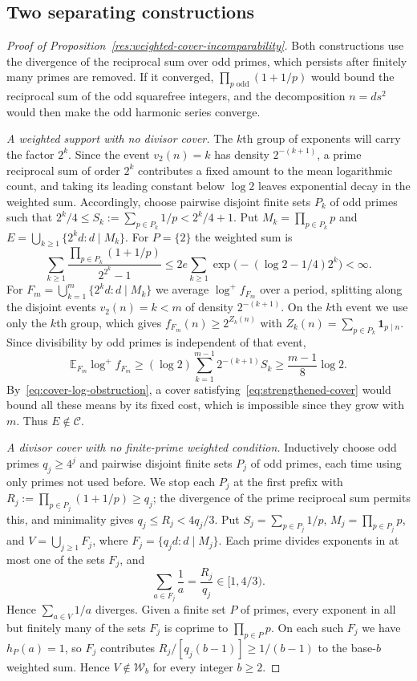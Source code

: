\documentclass[11pt]{article}
\begin{document}
\subsection{Two separating constructions}
\begin{proof}[Proof of Proposition~\ref{res:weighted-cover-incomparability}]
Both constructions use the divergence of the reciprocal sum over odd
primes, which persists after finitely many primes are removed. If it
converged, $\prod_{p\text{ odd}}(1+1/p)$ would bound the reciprocal sum
of the odd squarefree integers, and the decomposition $n=ds^2$ would
then make the odd harmonic series converge.

\emph{A weighted support with no divisor cover.}
The $k$th group of exponents will carry the factor $2^k$. Since the
event $v_2(n)=k$ has density $2^{-(k+1)}$, a prime reciprocal sum of
order $2^k$ contributes a fixed amount to the mean logarithmic count,
and taking its leading constant below $\log2$ leaves exponential decay
in the weighted sum. Accordingly, choose pairwise disjoint finite sets
$P_k$ of odd primes such that
$2^k/4\le S_k:=\sum_{p\in P_k}1/p<2^k/4+1$.  Put
$M_k=\prod_{p\in P_k}p$ and
$E=\bigcup_{k\ge1}\{2^kd:d\mid M_k\}$.
For $P=\{2\}$ the weighted sum is
\[
 \sum_{k\ge1}\frac{\prod_{p\in P_k}(1+1/p)}{2^{2^k}-1}
 \le 2e\sum_{k\ge1}
       \exp\bigl(-(\log2-1/4)2^k\bigr)<\infty.
\]
For $F_m=\bigcup_{k=1}^m\{2^kd:d\mid M_k\}$ we average
$\log^+f_{F_m}$ over a period, splitting along the disjoint events
$v_2(n)=k<m$ of density $2^{-(k+1)}$. On the $k$th event we use only
the $k$th group, which gives $f_{F_m}(n)\ge2^{Z_k(n)}$ with
$Z_k(n)=\sum_{p\in P_k}\mathbf1_{p\mid n}$. Since divisibility by odd
primes is independent of that event,
\[
 \mathbb E_{F_m}\log^+f_{F_m}
 \ge(\log2)\sum_{k=1}^{m-1}2^{-(k+1)}S_k
 \ge\frac{m-1}{8}\log2.
\]
By~\eqref{eq:cover-log-obstruction}, a cover
satisfying~\eqref{eq:strengthened-cover} would bound all these means by
its fixed cost, which is impossible since they grow with $m$. Thus
$E\notin\mathcal C$.

\emph{A divisor cover with no finite-prime weighted condition.}
Inductively choose odd primes $q_j\ge4^j$ and pairwise disjoint finite
sets $P_j$ of odd primes, each time using only primes not used before.
We stop each $P_j$ at the first prefix with
$R_j:=\prod_{p\in P_j}(1+1/p)\ge q_j$; the divergence of the prime
reciprocal sum permits this, and minimality gives $q_j\le R_j<4q_j/3$.
Put $S_j=\sum_{p\in P_j}1/p$, $M_j=\prod_{p\in P_j}p$, and
$V=\bigcup_{j\ge1}F_j$, where $F_j=\{q_jd:d\mid M_j\}$. Each prime
divides exponents in at most one of the sets $F_j$, and
\[
 \sum_{a\in F_j}\frac1a=\frac{R_j}{q_j}\in[1,4/3).
\]
Hence $\sum_{a\in V}1/a$ diverges. Given a finite set $P$ of primes,
every exponent in all but finitely many of the sets $F_j$ is coprime
to $\prod_{p\in P}p$. On each such $F_j$ we have $h_P(a)=1$, so $F_j$
contributes $R_j/[q_j(b-1)]\ge1/(b-1)$ to the base-$b$ weighted sum.
Hence $V\notin\mathcal W_b$ for every integer $b\ge2$.


\end{proof}
\end{document}
